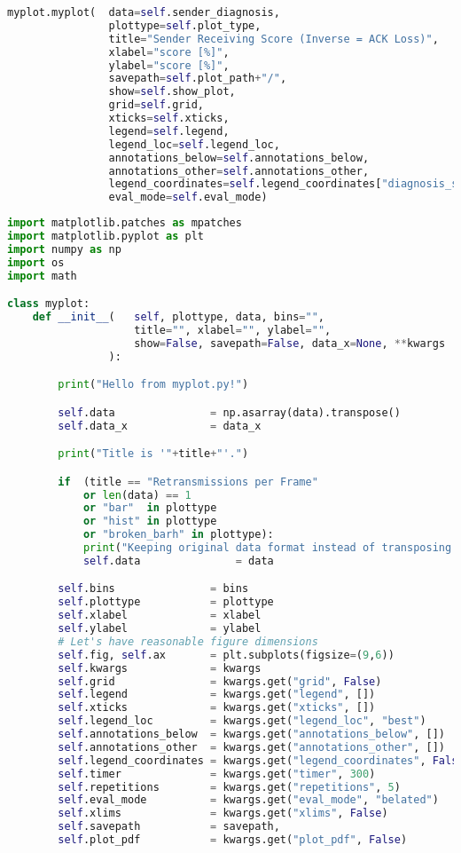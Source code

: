 \begin{lstlisting}[language=Python,caption=sniffer.py]
            myplot.myplot(  data=self.sender_diagnosis,
                plottype=self.plot_type,
                title="Sender Receiving Score (Inverse = ACK Loss)",
                xlabel="score [%]",
                ylabel="score [%]",
                savepath=self.plot_path+"/",
                show=self.show_plot,
                grid=self.grid,
                xticks=self.xticks,
                legend=self.legend,
                legend_loc=self.legend_loc,
                annotations_below=self.annotations_below,
                annotations_other=self.annotations_other,
                legend_coordinates=self.legend_coordinates["diagnosis_sender"],
                eval_mode=self.eval_mode)
\end{lstlisting}

\begin{lstlisting}[language=Python,caption=myplot.py]
import matplotlib.patches as mpatches
import matplotlib.pyplot as plt
import numpy as np
import os
import math

class myplot:
    def __init__(   self, plottype, data, bins="",
                    title="", xlabel="", ylabel="",
                    show=False, savepath=False, data_x=None, **kwargs
                ):

        print("Hello from myplot.py!")

        self.data               = np.asarray(data).transpose()
        self.data_x             = data_x

        print("Title is '"+title+"'.")

        if  (title == "Retransmissions per Frame"
            or len(data) == 1
            or "bar"  in plottype
            or "hist" in plottype
            or "broken_barh" in plottype):
            print("Keeping original data format instead of transposing.")
            self.data               = data

        self.bins               = bins
        self.plottype           = plottype
        self.xlabel             = xlabel
        self.ylabel             = ylabel
        # Let's have reasonable figure dimensions
        self.fig, self.ax       = plt.subplots(figsize=(9,6))
        self.kwargs             = kwargs
        self.grid               = kwargs.get("grid", False)
        self.legend             = kwargs.get("legend", [])
        self.xticks             = kwargs.get("xticks", [])
        self.legend_loc         = kwargs.get("legend_loc", "best")
        self.annotations_below  = kwargs.get("annotations_below", [])
        self.annotations_other  = kwargs.get("annotations_other", [])
        self.legend_coordinates = kwargs.get("legend_coordinates", False)
        self.timer              = kwargs.get("timer", 300)
        self.repetitions        = kwargs.get("repetitions", 5)
        self.eval_mode          = kwargs.get("eval_mode", "belated")
        self.xlims              = kwargs.get("xlims", False)
        self.savepath           = savepath,
        self.plot_pdf           = kwargs.get("plot_pdf", False)


\end{lstlisting}

